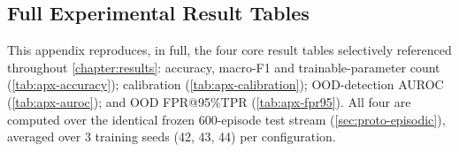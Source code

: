\documentclass{iutbscthesis}
\begin{document}

\printbib

\begin{appendices}

\chapter{Full Experimental Result Tables}
\label{apx:results}

This appendix reproduces, in full, the four core result tables selectively referenced throughout \autoref{chapter:results}: accuracy, macro-F1 and trainable-parameter count (\autoref{tab:apx-accuracy}); calibration (\autoref{tab:apx-calibration}); OOD-detection AUROC (\autoref{tab:apx-auroc}); and OOD FPR@95\%TPR (\autoref{tab:apx-fpr95}). All four are computed over the identical frozen 600-episode test stream (\autoref{sec:proto-episodic}), averaged over 3 training seeds (42, 43, 44) per configuration.


\end{appendices}
\end{document}
